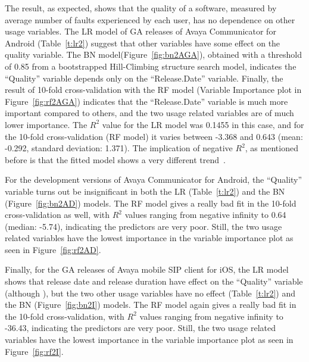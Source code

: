 \documentclass[smallextended]{svjour3}       %
\begin{document}
The result, as expected, shows that the quality of a software, measured by average number of faults experienced by each user, has no dependence on other usage variables. 
The LR model of GA releases of Avaya Communicator for Android (Table~\ref{t:lr2}) suggest that other variables have some effect on the quality variable.
The BN model(Figure~\ref{fig:bn2AGA}), obtained with a threshold of 0.85 from a bootstrapped Hill-Climbing structure search model, indicates the ``Quality'' variable depends only on  the ``Release.Date'' variable.
Finally, the result of 10-fold cross-validation with the RF model (Variable Importance plot in Figure~\ref{fig:rf2AGA}) indicates that the ``Release.Date'' variable is much more important compared to others, and the two usage related variables are of much lower importance. The $R^2$ value for the LR model was 0.1455 in this case, and for the 10-fold cross-validation (RF model) it varies between -3.368 and 0.643 (mean: -0.292, standard deviation: 1.371). The implication of negative $R^2$, as mentioned before is that the fitted model shows a very different trend~\cite{negRsq}.

For the development versions of Avaya Communicator for Android, the ``Quality'' variable turns out be insignificant in both the LR (Table~\ref{t:lr2}) and the BN (Figure~\ref{fig:bn2AD}) models. The RF model gives a really bad fit in the 10-fold cross-validation as well, with $R^2$ values ranging from negative infinity to 0.64 (median: -5.74), indicating the predictors are very poor. Still, the two usage related variables have the lowest importance in the variable importance plot as seen in Figure~\ref{fig:rf2AD}.

Finally, for the GA releases of Avaya mobile SIP client for iOS, the LR model shows that release date and release duration have effect on the ``Quality'' variable (although ), but the two other usage variables have no effect (Table~\ref{t:lr2}) and the BN (Figure~\ref{fig:bn2I}) models. The RF model again gives a really bad fit in the 10-fold cross-validation, with $R^2$ values ranging from negative infinity to -36.43, indicating the predictors are very poor. Still, the two usage related variables have the lowest importance in the variable importance plot as seen in Figure~\ref{fig:rf2I}.
\end{document}
